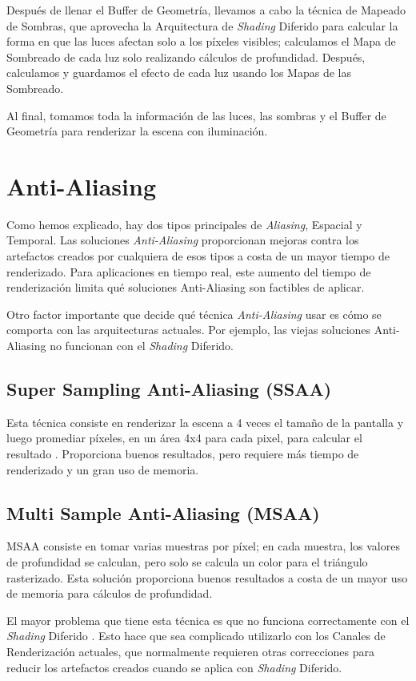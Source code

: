 \documentclass{cslthse-msc}
\begin{document}
Después de llenar el Buffer de Geometría, llevamos a cabo la técnica de Mapeado de Sombras, que aprovecha la Arquitectura de \textit{Shading} Diferido para calcular la forma en que las luces afectan solo a los píxeles visibles; calculamos el Mapa de Sombreado de cada luz solo realizando cálculos de profundidad. Después, calculamos y guardamos el efecto de cada luz usando los Mapas de las Sombreado.

Al final, tomamos toda la información de las luces, las sombras y el Buffer de Geometría para renderizar la escena con iluminación.


\section{Anti-Aliasing}
Como hemos explicado, hay dos tipos principales de \textit{Aliasing}, Espacial y Temporal. Las soluciones \textit{Anti-Aliasing} proporcionan mejoras contra los artefactos creados por cualquiera de esos tipos a costa de un mayor tiempo de renderizado. Para aplicaciones en tiempo real, este aumento del tiempo de renderización limita qué soluciones Anti-Aliasing son factibles de aplicar.

Otro factor importante que decide qué técnica \textit{Anti-Aliasing} usar es cómo se comporta con las arquitecturas actuales. Por ejemplo, las viejas soluciones Anti-Aliasing no funcionan con el \textit{Shading} Diferido.


\subsection{Super Sampling Anti-Aliasing (SSAA)}
Esta técnica consiste en renderizar la escena a 4 veces el tamaño de la pantalla y luego promediar píxeles, en un área 4x4 para cada pixel, para calcular el resultado \cite{Doggett2017EDAN35}. Proporciona buenos resultados, pero requiere más tiempo de renderizado y un gran uso de memoria.

\subsection{Multi Sample Anti-Aliasing (MSAA)}
MSAA consiste en tomar varias muestras por píxel; en cada muestra, los valores de profundidad se calculan, pero solo se calcula un color para el triángulo rasterizado. Esta solución proporciona buenos resultados a costa de un mayor uso de memoria para cálculos de profundidad.

El mayor problema que tiene esta técnica es que no funciona correctamente con el \textit{Shading} Diferido \cite{Doggett2017EDAN35}. Esto hace que sea complicado utilizarlo con los Canales de Renderización actuales, que normalmente requieren otras correcciones para reducir los artefactos creados cuando se aplica con \textit{Shading} Diferido.
\end{document}

